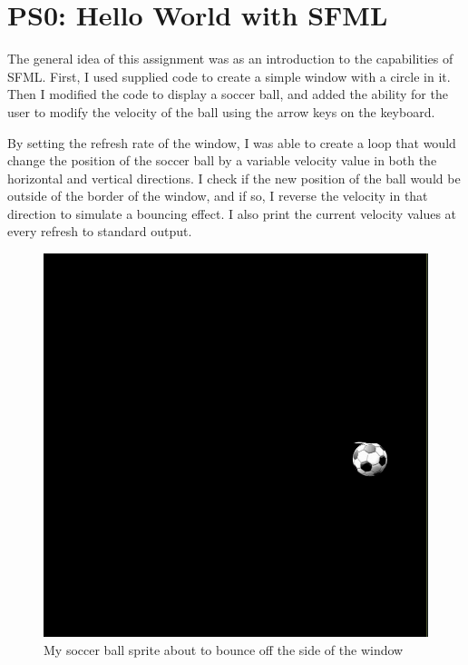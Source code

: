 \documentclass[12pt]{article}
\begin{document}
\newpage

\section{PS0: Hello World with SFML}

The general idea of this assignment was as an introduction to the capabilities of SFML. First, I used supplied code to create a simple window with a circle in it. Then I modified the code to display a soccer ball, and added the ability for the user to modify the velocity of the ball using the arrow keys on the keyboard.

By setting the refresh rate of the window, I was able to create a loop that would change the position of the soccer ball by a variable velocity value in both the horizontal and vertical directions. I check if the new position of the ball would be outside of the border of the window, and if so, I reverse the velocity in that direction to simulate a bouncing effect. I also print the current velocity values at every refresh to standard output.

\begin{figure}

\includegraphics[scale=0.3]{../ps0/screenshot_tearing_due_to_simulated_motion}
\centering
\caption{My soccer ball sprite about to bounce off the side of the window}
\end{figure}
\end{document}
